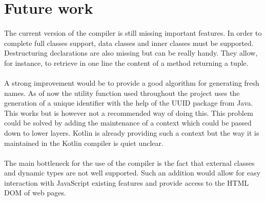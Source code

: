   \section{Future work}
   
  \paragraph{} The current version of the compiler is still missing important features. In order to complete full classes support, data classes and inner classes must be supported. Destructuring declarations are also missing but can be really handy. They allow, for instance, to retrieve in one line the content of a method returning a tuple.
  
  \paragraph{} A strong improvement would be to provide a good algorithm for generating fresh names. As of now the utility function used throughout the project uses the generation of a unique identifier with the help of the UUID package from Java. This works but is however not a recommended way of doing this. This problem could be solved by adding the maintenance of a context which could be passed down to lower layers. Kotlin is already providing such a context but the way it is maintained in the Kotlin compiler is quiet unclear.
  
  \paragraph{} The main bottleneck for the use of the compiler is the fact that external classes and dynamic types are not well supported. Such an addition would allow for easy interaction with JavaScript existing features and provide access to the HTML DOM of web pages.